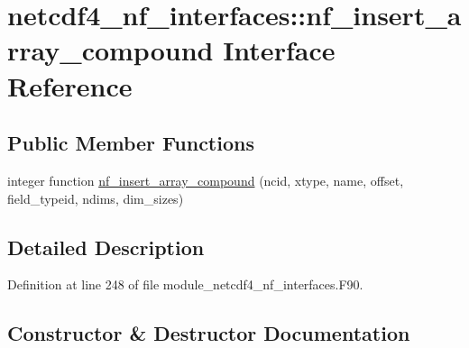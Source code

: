 \hypertarget{interfacenetcdf4__nf__interfaces_1_1nf__insert__array__compound}{}\section{netcdf4\+\_\+nf\+\_\+interfaces\+:\+:nf\+\_\+insert\+\_\+array\+\_\+compound Interface Reference}
\label{interfacenetcdf4__nf__interfaces_1_1nf__insert__array__compound}
\subsection*{Public Member Functions}
\begin{DoxyCompactItemize}
\item 
integer function \hyperlink{interfacenetcdf4__nf__interfaces_1_1nf__insert__array__compound_a99a268528487c883acce477207714ddf}{nf\+\_\+insert\+\_\+array\+\_\+compound} (ncid, xtype, name, offset, field\+\_\+typeid, ndims, dim\+\_\+sizes)
\end{DoxyCompactItemize}


\subsection{Detailed Description}


Definition at line 248 of file module\+\_\+netcdf4\+\_\+nf\+\_\+interfaces.\+F90.



\subsection{Constructor \& Destructor Documentation}
\mbox{\label{interfacenetcdf4__nf__interfaces_1_1nf__insert__array__compound_a99a268528487c883acce477207714ddf}} 

